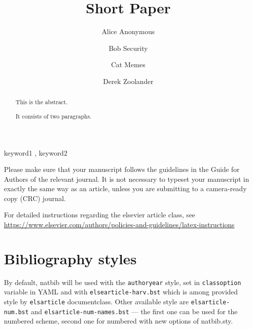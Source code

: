 \documentclass[preprint, 3p,
authoryear]{elsarticle} %
\begin{document}
\begin{frontmatter}

  \title{Short Paper}
    \author[Some Institute of Technology]{Alice Anonymous%
  }
    \author[Another University]{Bob Security%
  }
    \author[Another University]{Cat Memes%
  }
    \author[Some Institute of Technology]{Derek Zoolander%
  }
  
  \begin{abstract}
  This is the abstract.

  It consists of two paragraphs.
  \end{abstract}
    \begin{keyword}
    keyword1 \sep 
    keyword2
  \end{keyword}
  
 \end{frontmatter}

Please make sure that your manuscript follows the guidelines in the
Guide for Authors of the relevant journal. It is not necessary to
typeset your manuscript in exactly the same way as an article, unless
you are submitting to a camera-ready copy (CRC) journal.

For detailed instructions regarding the elsevier article class, see
\url{https://www.elsevier.com/authors/policies-and-guidelines/latex-instructions}

\section{Bibliography styles}\label{bibliography-styles}

By default, natbib will be used with the \texttt{authoryear} style, set
in \texttt{classoption} variable in YAML and with
\texttt{elsearticle-harv.bst} which is among provided style by
\texttt{elsarticle} documentclass. Other available style are
\texttt{elsarticle-num.bst} and \texttt{elsarticle-num-names.bst} ---
the first one can be used for the numbered scheme, second one for
numbered with new options of natbib.sty.
\end{document}
